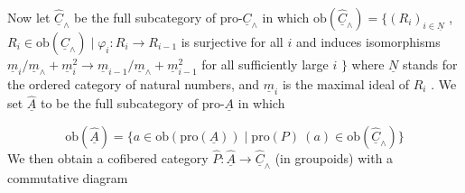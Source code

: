 \begin{center}
\end{center}
Now let  $\widehat{\underline{C}}_\wedge$  be the full subcategory of  pro-$\underline{C}_\wedge$  in which $\mathrm{ob}(\widehat{\underline{C}}_\wedge) = \{(R_i)_{i \in \underline{N}}$  ,  $R_i \in \mathrm{ob}(\underline{C}_\wedge) \mid \varphi_i : R_i \to R_{i-1}$  is surjective for all  $i$  and induces isomorphisms  $\underline{m}_i/\underline{m}_\wedge + \underline{m}_i^2 \to \underline{m}_{i-1}/\underline{m}_\wedge + \underline{m}_{i-1}^2$  for all sufficiently large  $i$  $\}$ where  $\underline{N}$  stands for the ordered category of natural numbers, and  $\underline{m}_i$  is the maximal ideal of  $R_i$  . We set  $\widehat{\underline{A}}$  to be the full subcategory of pro-$\underline{A}$  in which

\begin{equation*}
\mathrm{ob}(\widehat{\underline{A}}) = \{a \in \mathrm{ob}(\mathrm{pro}(\underline{A})) \mid \mathrm{pro}(P)\ (a) \in \mathrm{ob}(\widehat{\underline{C}}_\wedge)\}
\end{equation*}
We then obtain a cofibered category  $\widehat{P} : \widehat{\underline{A}} \to \widehat{\underline{C}}_\wedge$  (in groupoids) with a commutative diagram

